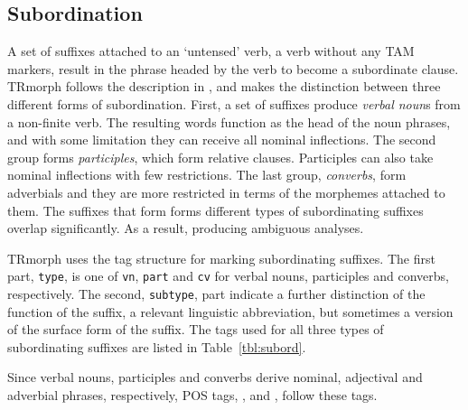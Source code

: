 \documentclass[twocolumn]{article}
\begin{document}
\subsection{\label{ssec:subordination}Subordination}

A set of suffixes attached to an `untensed' verb, a verb without any
TAM markers, result in the phrase headed by the verb to become a
subordinate clause. TRmorph follows the description in
\cite{goksel2005}, and makes the distinction between three different
forms of subordination. First, a set of suffixes produce \emph{verbal
noun}s from a non-finite verb. The resulting words function as the
head of the noun phrases,
and with some limitation they can receive all nominal inflections. The
second group forms \emph{participles}, which form relative clauses.
Participles can also take nominal inflections with few
restrictions. The last group, \emph{converbs}, form adverbials and
they are more restricted in terms of the morphemes attached to
them. The suffixes that form forms different types of subordinating
suffixes overlap significantly. As a result, producing ambiguous
analyses.

TRmorph uses the tag structure  for marking
subordinating suffixes. The first part, \texttt{type}, is one of
\texttt{vn}, \texttt{part} and \texttt{cv} for verbal nouns,
participles and converbs, respectively. The second, \texttt{subtype}, 
part indicate a further distinction of the function of the suffix,
a relevant linguistic abbreviation, but sometimes a version of the
surface form of the suffix. The tags used for all three types of
subordinating suffixes are listed in Table~\ref{tbl:subord}.

Since verbal nouns, participles and converbs derive nominal, adjectival
and adverbial phrases, respectively, POS tags, , 
and , follow these tags.
\end{document}
